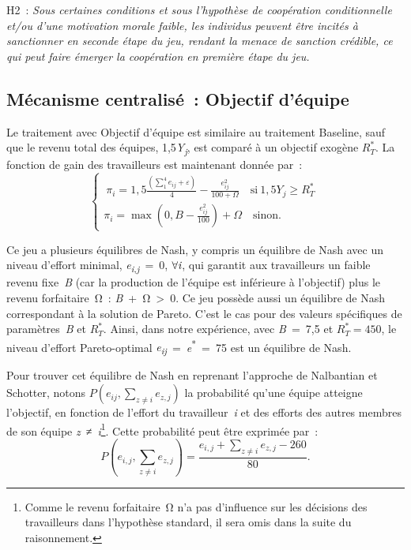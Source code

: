 \begin{Article}
\begin{refsection}[Lebourges]
\begin{appendices}
\vspace{0,2cm}
H2~: \emph{Sous certaines conditions et sous l'hypothèse de coopération
conditionnelle et/ou d'une motivation morale faible, les individus
peuvent être incités à sanctionner en seconde étape du jeu, rendant la
menace de sanction crédible, ce qui peut faire émerger la coopération en
première étape du jeu.}

\subsection{Mécanisme centralisé~: Objectif d'équipe}

Le traitement avec Objectif d'équipe est similaire au traitement
Baseline, sauf que le revenu total des équipes,
1,5\emph{Y\textsubscript{j}}, est comparé à un objectif exogène
\(R_{T}^{*}\). La fonction de gain des travailleurs est maintenant
donnée par~:
\begin{equation}
  \left\{ \begin{array}{r}
{\ \pi}_{i} = 1,5\frac{\left( \sum_{1}^{4}e_{ij} + \varepsilon \right)}{4} - \frac{e_{ij}^{2}}{100 + \Omega} \quad \text{si}\ 1,5Y_{j} \geq R_{T}^{*} \\
\pi_{i} = \max\left( 0,B - \frac{e_{ij}^{2}}{100} \right) + \Omega \quad \text{sinon.}
\end{array} \right.\  
\end{equation}

Ce jeu a plusieurs équilibres de Nash, y compris un équilibre de Nash
avec un niveau d'effort minimal,
\emph{e\textsubscript{i}}\textsubscript{,\emph{j}}\emph{~}=~0,
$\forall\emph{i}$, qui garantit aux travailleurs un faible revenu fixe~\emph{B}
(car la production de l'équipe est inférieure à l'objectif) plus le
revenu forfaitaire~Ω~: \emph{B}~+~Ω~\textgreater~0. Ce jeu possède aussi
un équilibre de Nash correspondant à la solution de Pareto. C'est le cas
pour des valeurs spécifiques de paramètres~\emph{B} et \(R_{T}^{*}\).
Ainsi, dans notre expérience, avec \emph{B~}=~7,5 et
\(R_{T}^{*} = 450\), le niveau d'effort Pareto-optimal
\emph{e\textsubscript{ij}}~=~\emph{e}\textsuperscript{*}~=~75 est un
équilibre de Nash.

Pour trouver cet équilibre de Nash en reprenant l'approche de Nalbantian
et Schotter, notons \(P\left( e_{ij},\sum_{z \neq i}^{}e_{z,j} \right)\)
la probabilité qu'une équipe atteigne l'objectif, en fonction de
l'effort du travailleur~\emph{i} et des efforts des autres membres de
son équipe \emph{z}~≠~\emph{i}\footnote{Comme le revenu forfaitaire~Ω
  n'a pas d'influence sur les décisions des travailleurs dans
  l'hypothèse standard, il sera omis dans la suite du raisonnement.}.
Cette probabilité peut être exprimée par~:
\begin{equation}
   P\left( e_{i,j},\sum_{z \neq i}^{}e_{z,j} \right) = \frac{e_{i,j} + \sum_{z \neq i}^{}{e_{z,j} - 260}}{80}.
\end{equation}


\end{appendices}
\end{refsection}
\end{Article}
